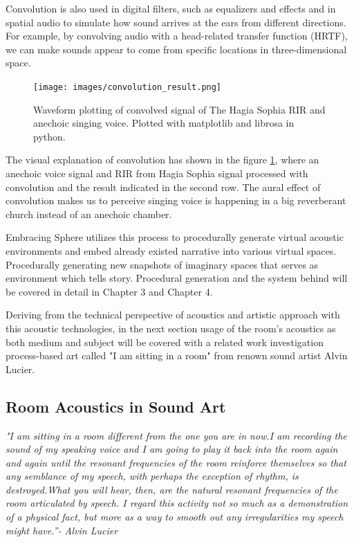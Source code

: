             Convolution is also used in digital filters, such as equalizers and effects and in spatial audio to simulate how sound arrives at the ears from different directions. For example, by convolving audio with a head-related transfer function (HRTF), we can make sounds appear to come from specific locations in three-dimensional space\cite{3D_Audio}.\par

            \begin{figure}[H]
                \centering
                \texttt{[image: images/convolution\_result.png]}
                \caption{Waveform plotting of convolved signal of The Hagia Sophia RIR and anechoic singing voice. Plotted with matplotlib and librosa in python.}
                \label{fig:CONV_RESULT}
            \end{figure}
            
            The visual explanation of convolution has shown in the figure \ref{fig:CONV_RESULT}, where an anechoic voice signal and RIR from Hagia Sophia signal processed with convolution and the result indicated in the second row. The aural effect of convolution makes us to perceive singing voice is happening in a big reverberant church instead of an anechoic chamber.\par

            Embracing Sphere utilizes this process to procedurally generate virtual acoustic environments and embed already existed narrative into various virtual spaces. Procedurally generating new snapshots of imaginary spaces that serves as environment which tells story. Procedural generation and the system behind will be covered in detail in Chapter 3 and Chapter 4.\par

            Deriving from the technical perspective of acoustics and artistic approach with this acoustic technologies, in the next section usage of the room's acoustics as both medium and subject will be covered with a related work investigation process-based art called "I am sitting in a room" from renown sound artist Alvin Lucier.\par
        \subsection{Room Acoustics in Sound Art}
            \emph{"I am sitting in a room different from the one you are in now.\newline I am recording the sound of my speaking voice and I am going to play it back into the room again and again until the resonant frequencies of the room reinforce themselves so that any semblance of my speech, with perhaps the exception of rhythm, is destroyed.\newline What you will hear, then, are the natural resonant frequencies of the room articulated by speech. I regard this activity not so much as a demonstration of a physical fact, but more as a way to smooth out any irregularities my speech might have.”\newline - Alvin Lucier\cite{Alvin_Lucier_I_am_Sitting_in_a_Room}}

